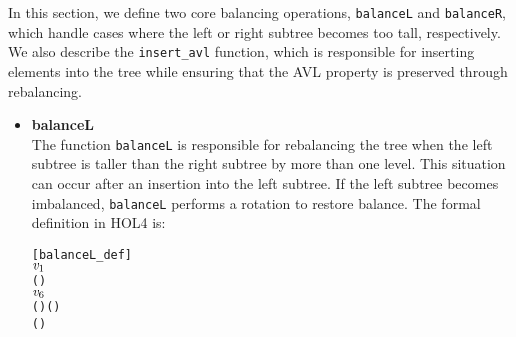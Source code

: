 \documentclass[12pt]{article}
\begin{document}
In this section, we define two core balancing operations, \texttt{balanceL} and \texttt{balanceR}, which handle cases where the left or right subtree becomes too tall, respectively. We also describe the \texttt{insert\_avl} function, which is responsible for inserting elements into the tree while ensuring that the AVL property is preserved through rebalancing.

\begin{itemize}

  \item \textbf{balanceL} \\
  The function \texttt{balanceL} is responsible for rebalancing the tree when the left subtree is taller than the right subtree by more than one level. This situation can occur after an insertion into the left subtree. If the left subtree becomes imbalanced, \texttt{balanceL} performs a rotation to restore balance. The formal definition in HOL4 is:

\begin{alltt}
[balanceL_def]
     \HOLTokenDefEquality{}
     \HOLSymConst{=}   \HOLSymConst{\ensuremath{+}}  
      
       \HOLTokenImp{}     
    \HOLTokenBar{}  \ensuremath{\HOLBoundVar{v}\sb{\mathrm{1}}}     \HOLTokenImp{}
         \HOLSymConst{\HOLTokenLt{}}   
          
           \HOLTokenImp{}     (    )
        \HOLTokenBar{}  \ensuremath{\HOLBoundVar{v}\sb{\mathrm{6}}}     \HOLTokenImp{}
             (    ) (    )
           (    )
       
\end{alltt}
  

\end{itemize}
\end{document}
